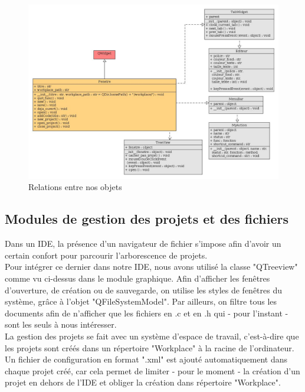 \documentclass[a4paper,12pt]{article}
\begin{document}
			\begin{figure}[h!]
				\includegraphics[scale=0.4]{images/uml_module_gui_relations}
				\caption{Relations entre nos objets}
			\end{figure}
			
		\newpage			
		\subsection{Modules de gestion des projets et des fichiers}
		
		Dans un IDE, la présence d’un navigateur de fichier s’impose afin d’avoir un certain confort pour parcourir l’arborescence de projets.\\
		Pour intégrer ce dernier dans notre IDE, nous avons utilisé la classe "QTreeview" comme vu ci-dessus dans le module graphique. Afin d'afficher les fenêtres d'ouverture, de création ou de sauvegarde, on utilise les styles de fenêtres du système, grâce à l'objet "QFileSystemModel". Par ailleurs, on filtre tous les documents afin de n'afficher que les fichiers en .c et en .h qui - pour l'instant - sont les seuls à nous intéresser.\\
		
		La gestion des projets se fait avec un système d'espace de travail, c’est-à-dire que les projets sont créés dans un répertoire "Workplace" à la racine de l’ordinateur. Un fichier de configuration en format ".xml" est ajouté automatiquement dans chaque projet créé, car cela permet de limiter - pour le moment - la création d’un projet en dehors de l’IDE et obliger la création dans répertoire "Workplace".\\
		
\end{document}
